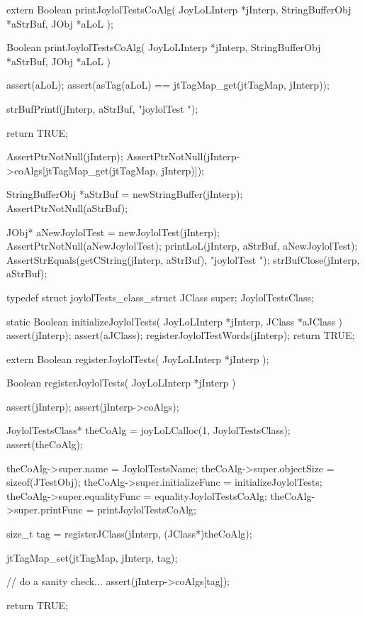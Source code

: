 \startCHeader
extern Boolean printJoylolTestsCoAlg(
  JoyLoLInterp    *jInterp,
  StringBufferObj *aStrBuf,
  JObj            *aLoL
);
\stopCHeader
{}

\startCCode
Boolean printJoylolTestsCoAlg(
  JoyLoLInterp    *jInterp,
  StringBufferObj *aStrBuf,
  JObj            *aLoL
) {
  assert(aLoL);
  assert(asTag(aLoL) == jtTagMap_get(jtTagMap, jInterp));

  strBufPrintf(jInterp, aStrBuf, "joylolTest ");
  
  return TRUE;
}
\stopCCode


\startCTest
  AssertPtrNotNull(jInterp);
  AssertPtrNotNull(jInterp->coAlgs[jtTagMap_get(jtTagMap, jInterp)]);

  StringBufferObj *aStrBuf = newStringBuffer(jInterp);
  AssertPtrNotNull(aStrBuf);
  
  JObj* aNewJoylolTest = newJoylolTest(jInterp);
  AssertPtrNotNull(aNewJoylolTest);
  printLoL(jInterp, aStrBuf, aNewJoylolTest);
  AssertStrEquals(getCString(jInterp, aStrBuf), "joylolTest ");
  strBufClose(jInterp, aStrBuf);
\stopCTest
\stopTestCase
\stopTestSuite

\startTestSuite[registerJoylolTests]

\startCHeader
typedef struct joylolTests_class_struct {
  JClass         super;
} JoylolTestsClass;

\stopCHeader

\startCCode
static Boolean initializeJoylolTests(
  JoyLoLInterp *jInterp,
  JClass       *aJClass
) {
  assert(jInterp);
  assert(aJClass);
  registerJoylolTestWords(jInterp);
  return TRUE;
}
\stopCCode

\startCHeader
extern Boolean registerJoylolTests(
  JoyLoLInterp *jInterp
);
\stopCHeader
{}

\startCCode
Boolean registerJoylolTests(
  JoyLoLInterp *jInterp
) {
  assert(jInterp);
  assert(jInterp->coAlgs);
  
  JoylolTestsClass* theCoAlg
    = joyLoLCalloc(1, JoylolTestsClass);
  assert(theCoAlg);
  
  theCoAlg->super.name           = JoylolTestsName;
  theCoAlg->super.objectSize     = sizeof(JTestObj);
  theCoAlg->super.initializeFunc = initializeJoylolTests;
  theCoAlg->super.equalityFunc   = equalityJoylolTestsCoAlg;
  theCoAlg->super.printFunc      = printJoylolTestsCoAlg;
  
  size_t tag =
    registerJClass(jInterp, (JClass*)theCoAlg);
  
  jtTagMap_set(jtTagMap, jInterp, tag);
  
  // do a sanity check...
  assert(jInterp->coAlgs[tag]);
   
  return TRUE;
}
\stopCCode

